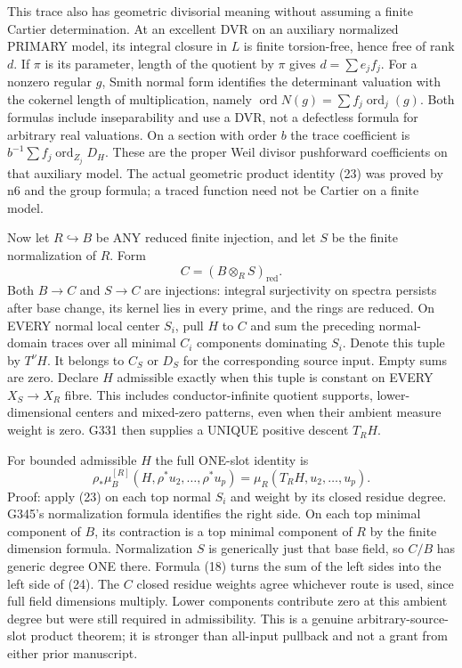 This trace also has geometric divisorial meaning without assuming a finite Cartier determination. At an excellent DVR on an auxiliary normalized PRIMARY model, its integral closure in $L$ is finite torsion-free, hence free of rank $d$. If $\pi$ is its parameter, length of the quotient by $\pi$ gives $d=\sum e_jf_j$. For a nonzero regular $g$, Smith normal form identifies the determinant valuation with the cokernel length of multiplication, namely $\operatorname{ord}N(g)=\sum f_j\operatorname{ord}_j(g)$. Both formulas include inseparability and use a DVR, not a defectless formula for arbitrary real valuations. On a section with order $b$ the trace coefficient is $b^{-1}\sum f_j\operatorname{ord}_{Z_j}D_H$. These are the proper Weil divisor pushforward coefficients on that auxiliary model. The actual geometric product identity (23) was proved by n6 and the group formula; a traced function need not be Cartier on a finite model.

Now let $R\hookrightarrow B$ be ANY reduced finite injection, and let $S$ be the finite normalization of $R$. Form
\[
C=(B\otimes_R S)_{\mathrm{red}}.
\]
Both $B\to C$ and $S\to C$ are injections: integral surjectivity on spectra persists after base change, its kernel lies in every prime, and the rings are reduced. On EVERY normal local center $S_i$, pull $H$ to $C$ and sum the preceding normal-domain traces over all minimal $C_i$ components dominating $S_i$. Denote this tuple by $T^\nu H$. It belongs to $C_S$ or $D_S$ for the corresponding source input. Empty sums are zero. Declare $H$ admissible exactly when this tuple is constant on EVERY $X_S\to X_R$ fibre. This includes conductor-infinite quotient supports, lower-dimensional centers and mixed-zero patterns, even when their ambient measure weight is zero. G331 then supplies a UNIQUE positive descent $T_RH$.

For bounded admissible $H$ the full ONE-slot identity is
\[
\rho_*\mu_B^{[R]}(H,\rho^*u_2,\ldots,\rho^*u_p)
=\mu_R(T_RH,u_2,\ldots,u_p).                          \tag{24}
\]
Proof: apply (23) on each top normal $S_i$ and weight by its closed residue degree. G345's normalization formula identifies the right side. On each top minimal component of $B$, its contraction is a top minimal component of $R$ by the finite dimension formula. Normalization $S$ is generically just that base field, so $C/B$ has generic degree ONE there. Formula (18) turns the sum of the left sides into the left side of (24). The $C$ closed residue weights agree whichever route is used, since full field dimensions multiply. Lower components contribute zero at this ambient degree but were still required in admissibility. This is a genuine arbitrary-source-slot product theorem; it is stronger than all-input pullback and not a grant from either prior manuscript.

